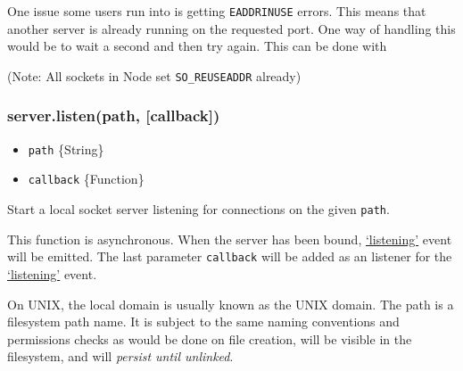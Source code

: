 One issue some users run into is getting \texttt{EADDRINUSE} errors.
This means that another server is already running on the requested port.
One way of handling this would be to wait a second and then try again.
This can be done with

\begin{Shaded}
\begin{Highlighting}[]
\NormalTok{(}\NormalTok{, } 
   \NormalTok{(} \NormalTok{== }\NormalTok{) \{}
    \NormalTok{(}\NormalTok{);}
    \NormalTok{(} \NormalTok{() \{}
      \NormalTok{();}
    \NormalTok{\}, }\NormalTok{);}
  \NormalTok{\}}
\NormalTok{\});}
\end{Highlighting}
\end{Shaded}

(Note: All sockets in Node set \texttt{SO\_REUSEADDR} already)

\subsubsection{server.listen(path,
{[}callback{]})}\label{server.listenpath-callback}

\begin{itemize}
\itemsep1pt\parskip0pt
\item
  \texttt{path} \{String\}
\item
  \texttt{callback} \{Function\}
\end{itemize}

Start a local socket server listening for connections on the given
\texttt{path}.

This function is asynchronous. When the server has been bound,
\hyperref[netux5feventux5flistening]{`listening'} event will be emitted.
The last parameter \texttt{callback} will be added as an listener for
the \hyperref[netux5feventux5flistening]{`listening'} event.

On UNIX, the local domain is usually known as the UNIX domain. The path
is a filesystem path name. It is subject to the same naming conventions
and permissions checks as would be done on file creation, will be
visible in the filesystem, and will \emph{persist until unlinked}.

